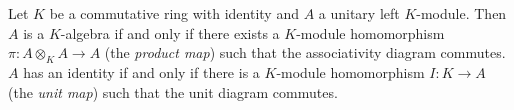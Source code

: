 Let $K$ be a commutative ring with identity and $A$ a unitary left $K$-module. Then $A$ is a $K$-algebra if and only if there exists a $K$-module homomorphism $\pi : A \otimes_K A \to A$ (the \emph{product map}) such that the associativity diagram commutes. $A$ has an identity if and only if there is a $K$-module homomorphism $I : K \to A$ (the \emph{unit map}) such that the unit diagram commutes.
